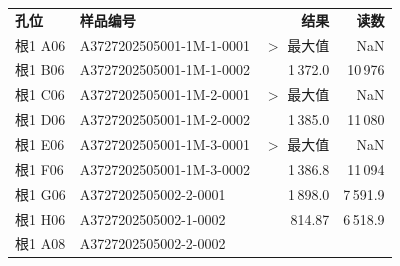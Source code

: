 \documentclass[UTF8,10pt,a4paper,fontset=fandol]{ctexart}
\newcommand{\fieldvalue}[1]{#1}
\begin{document}
\begin{tabularx}{\textwidth}{@{}lXrr@{}}
\textbf{孔位} & \textbf{样品编号} & \textbf{结果} & \textbf{读数}\\
根1 A06 &
\fieldvalue{A3727202505001-1M-1-0001} &
\fieldvalue{$>$ 最大值} &
\fieldvalue{NaN}\\
根1 B06 &
\fieldvalue{A3727202505001-1M-1-0002} &
\fieldvalue{1\,372.0} &
\fieldvalue{10\,976}\\
根1 C06 &
\fieldvalue{A3727202505001-1M-2-0001} &
\fieldvalue{$>$ 最大值} &
\fieldvalue{NaN}\\
根1 D06 &
\fieldvalue{A3727202505001-1M-2-0002} &
\fieldvalue{1\,385.0} &
\fieldvalue{11\,080}\\
根1 E06 &
\fieldvalue{A3727202505001-1M-3-0001} &
\fieldvalue{$>$ 最大值} &
\fieldvalue{NaN}\\
根1 F06 &
\fieldvalue{A3727202505001-1M-3-0002} &
\fieldvalue{1\,386.8} &
\fieldvalue{11\,094}\\
根1 G06 &
\fieldvalue{A3727202505002-2-0001} &
\fieldvalue{1\,898.0} &
\fieldvalue{7\,591.9}\\
根1 H06 &
\fieldvalue{A3727202505002-1-0002} &
\fieldvalue{814.87} &
\fieldvalue{6\,518.9}\\
根1 A08 &
\fieldvalue{A3727202505002-2-0002} &

\end{tabularx}
\end{document}

